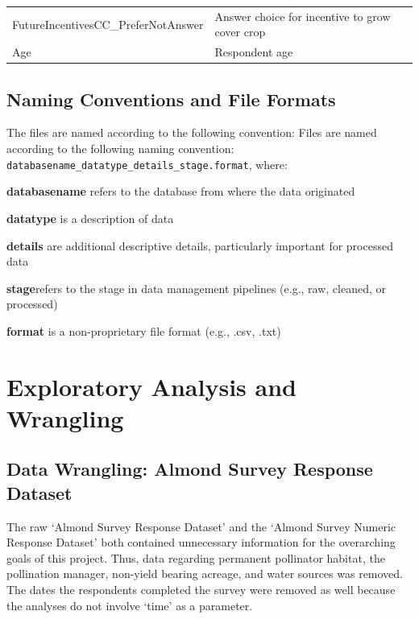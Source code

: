 \documentclass[12pt,]{article}
\begin{document}
\begin{longtable}[]{@{}ll@{}}
\begin{minipage}[t]{0.59\columnwidth}
FutureIncentivesCC\_PreferNotAnswer\strut
\end{minipage} & \begin{minipage}[t]{0.18\columnwidth}\raggedright\strut
Answer choice for incentive to grow cover crop\strut
\end{minipage}\tabularnewline
\begin{minipage}[t]{0.59\columnwidth}\raggedright\strut
Age\strut
\end{minipage} & \begin{minipage}[t]{0.18\columnwidth}\raggedright\strut
Respondent age\strut
\end{minipage}\tabularnewline
\bottomrule
\end{longtable}

\subsection{Naming Conventions and File
Formats}\label{naming-conventions-and-file-formats}

The files are named according to the following convention: Files are
named according to the following naming convention:
\texttt{databasename\_datatype\_details\_stage.format}, where:

\textbf{databasename} refers to the database from where the data
originated

\textbf{datatype} is a description of data

\textbf{details} are additional descriptive details, particularly
important for processed data

\textbf{stage}refers to the stage in data management pipelines (e.g.,
raw, cleaned, or processed)

\textbf{format} is a non-proprietary file format (e.g., .csv, .txt)

\newpage

\section{Exploratory Analysis and
Wrangling}\label{exploratory-analysis-and-wrangling}

\subsection{Data Wrangling: Almond Survey Response
Dataset}\label{data-wrangling-almond-survey-response-dataset}

The raw `Almond Survey Response Dataset' and the `Almond Survey Numeric
Response Dataset' both contained unnecessary information for the
overarching goals of this project. Thus, data regarding permanent
pollinator habitat, the pollination manager, non-yield bearing acreage,
and water sources was removed. The dates the respondents completed the
survey were removed as well because the analyses do not involve `time'
as a parameter.
\end{document}
